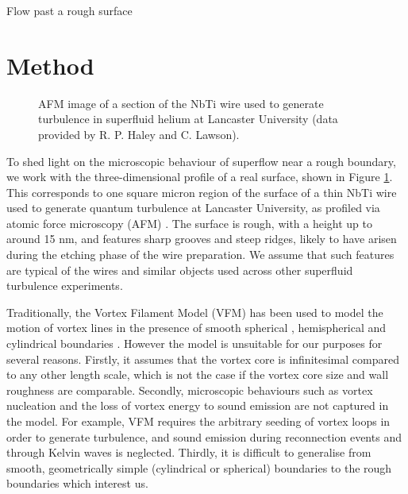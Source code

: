 \begin{chapter}{\label{cha:afm}Flow past a rough surface}
\section{Method\label{section:methodafm}}
\begin{figure}
  \centering
  \caption{\label{fig:afmreal}AFM image of a section of the NbTi wire used to generate turbulence in superfluid helium at Lancaster University (data provided by R. P. Haley and C. Lawson).}
\end{figure}
To shed light on the microscopic behaviour of superflow near a rough
boundary, we work with the three-dimensional profile of a real surface, shown in Figure \ref{fig:afmreal}.  This corresponds to one square micron region of the surface of a thin NbTi wire used to generate quantum turbulence at Lancaster University, as profiled via atomic force microscopy (AFM) \cite{Lawson}.  The surface is rough, with a height up to around 15 nm, and features sharp grooves and steep ridges, likely to have arisen during the etching phase of the wire preparation. We assume that such features are typical of the wires and similar objects used across other superfluid turbulence experiments. 

Traditionally, the Vortex Filament Model (VFM) \cite{Schwarz}
has been used to model the motion of vortex lines in the presence of
smooth spherical \cite{Hanninen-sphere,Kivotides-sphere},
hemispherical \cite{Schwarz-bump,PhysRevB.50.579} 
and cylindrical boundaries \cite{Hanninen-PNAS,goto08}.
However the model is unsuitable for our purposes for several reasons.
Firstly, it assumes that the vortex core is infinitesimal compared to 
any other length scale, which is not the case if the
vortex core size and wall roughness are comparable.
Secondly, microscopic behaviours such as vortex nucleation and the loss of vortex energy to sound emission are not captured in the model. For example, VFM requires the arbitrary seeding of vortex loops in order to generate turbulence, and sound emission during reconnection events and through Kelvin waves is neglected. Thirdly, it is difficult to generalise from smooth, geometrically simple (cylindrical or spherical)
boundaries to the rough boundaries which interest us.


\end{chapter}
